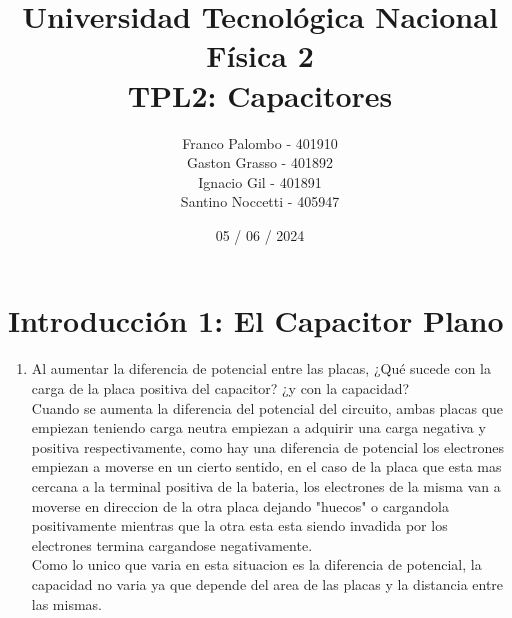 \documentclass[12pt]{report}
\title{%
  \fontsize{25}{0}\selectfont Universidad Tecnológica Nacional \\
  \fontsize{22}{30}\selectfont Física 2 \\
  \fontsize{18}{25}\selectfont TPL2: Capacitores
}
\author{
  Franco Palombo - 401910\\
  Gaston Grasso - 401892\\
  Ignacio Gil - 401891\\
  Santino Noccetti - 405947\\
}
\date{05 / 06 / 2024}
\begin{document}
\maketitle

\section{Introducción 1: El Capacitor Plano}

\begin{enumerate}
    \item Al aumentar la diferencia de potencial entre las placas, ¿Qué sucede con la carga de la placa positiva del capacitor? ¿y con la capacidad?\\[6pt]
    Cuando se aumenta la diferencia del potencial del circuito, ambas placas que empiezan teniendo carga neutra empiezan a adquirir una carga negativa y positiva respectivamente, como hay una diferencia de potencial los electrones empiezan a moverse en un cierto sentido, en el caso de la placa que esta mas cercana a la terminal positiva de la bateria, los electrones de la misma van a moverse en direccion de la otra placa  dejando "huecos" o cargandola positivamente mientras que la otra esta esta siendo invadida por los electrones termina cargandose negativamente.\\
    Como lo unico que varia en esta situacion es la diferencia de potencial, la capacidad no varia ya que depende del area de las placas y la distancia entre las mismas.\\


\end{enumerate}
\end{document}
